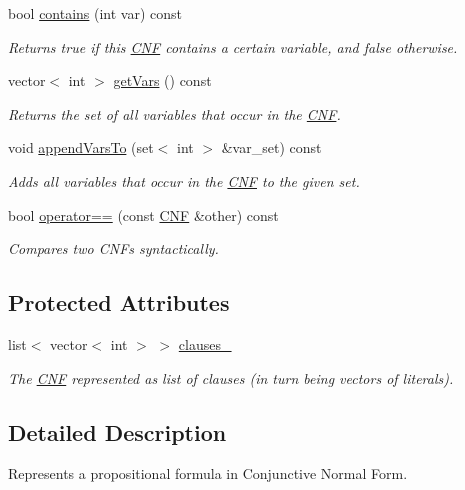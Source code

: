 \begin{DoxyCompactItemize}
bool \hyperlink{classCNF_aa450a94a6161936d1a3cdffd083a0e42}{contains} (int var) const 
\begin{DoxyCompactList}\small\item\em Returns true if this \hyperlink{classCNF}{C\-N\-F} contains a certain variable, and false otherwise. \end{DoxyCompactList}\item 
vector$<$ int $>$ \hyperlink{classCNF_a4847969cea924a74642e3d914135d8da}{get\-Vars} () const 
\begin{DoxyCompactList}\small\item\em Returns the set of all variables that occur in the \hyperlink{classCNF}{C\-N\-F}. \end{DoxyCompactList}\item 
void \hyperlink{classCNF_a8a54b640d4fbb1da74979fc07536d4e9}{append\-Vars\-To} (set$<$ int $>$ \&var\-\_\-set) const 
\begin{DoxyCompactList}\small\item\em Adds all variables that occur in the \hyperlink{classCNF}{C\-N\-F} to the given set. \end{DoxyCompactList}\item 
bool \hyperlink{classCNF_a5ce0741b551948faff1d3365871b2218}{operator==} (const \hyperlink{classCNF}{C\-N\-F} \&other) const 
\begin{DoxyCompactList}\small\item\em Compares two C\-N\-Fs syntactically. \end{DoxyCompactList}\end{DoxyCompactItemize}
\subsection*{Protected Attributes}
\begin{DoxyCompactItemize}
\item 
list$<$ vector$<$ int $>$ $>$ \hyperlink{classCNF_acc8cc195dc20d00c47d6a2282b45a612}{clauses\-\_\-}
\begin{DoxyCompactList}\small\item\em The \hyperlink{classCNF}{C\-N\-F} represented as list of clauses (in turn being vectors of literals). \end{DoxyCompactList}\end{DoxyCompactItemize}


\subsection{Detailed Description}
Represents a propositional formula in Conjunctive Normal Form. 

